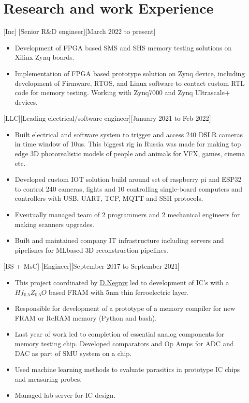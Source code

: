 \documentclass{article}
\begin{document}
\section{Research and work Experience}
[Inc]
[Senior R\&D engineer][March 2022 to present]
   \begin{itemize}
      \item Development of FPGA based SMS and SHS memory testing solutions on Xilinx Zynq boards.
      \item Implementation of FPGA based prototype solution on Zynq device, including development of Firmware, RTOS, and Linux software to contact custom RTL code for memory testing. Working with Zynq7000 and Zynq Ultrascale+ devices.
   \end{itemize}  

[LLC][Leading electrical/software engineer][January 2021 to Feb 2022]
\begin{itemize}
   \item Built electrical and software system to trigger and access 240 DSLR cameras in time window of 10us. This biggest rig in Russia was made for making top edge 3D photorealistic models of people and animals for VFX, games, cinema etc.
   \item Developed custom IOT solution build around set of raspberry pi and ESP32 to control 240 cameras, lights and 10 controlling single-board computers and controllers with USB, UART, TCP, MQTT and SSH protocols.
   \item Eventually managed team of 2 programmers and 2 mechanical engineers for making scanners upgrades.
   \item  Built and maintained company IT infrastructure including servers and pipelisnes for MLbased 3D reconstruction pipelines.
\end{itemize}

[BS + MsC]
[Engineer][September 2017 to September 2021]
\begin{itemize}
\item This project coordinated by  \href{https://www.scopus.com/authid/detail.uri?authorId=56272708000}{D.Negrov}   led to development of IC's with a $Hf_{0.5} Z_{0.5} O $ based  FRAM with 5nm thin ferroelectric layer.
\item Responsible for development of a prototype of a memory  compiler for new FRAM or ReRAM memory (Python and bash).
\item Last year of work led to completion of essential analog components for memory testing chip. Developed comparators and Op Amps for ADC and DAC as part of SMU system on a chip.
\item Used machine learning methods to evaluate parasitics in prototype IC chips and measuring probes.
\item Managed lab server for IC design.
\end{itemize}
\end{document}
